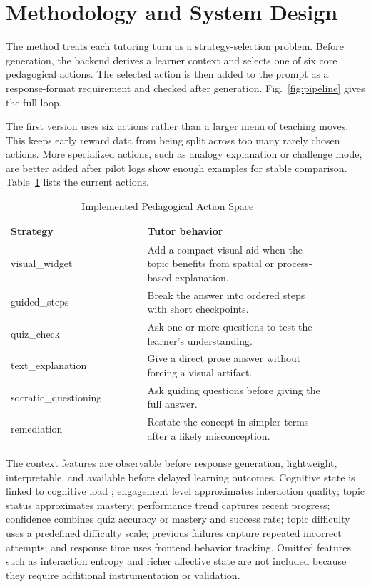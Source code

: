 \documentclass[conference]{IEEEtran}
\begin{document}
\section{Methodology and System Design}

The method treats each tutoring turn as a strategy-selection problem. Before generation, the backend derives a learner context and selects one of six core pedagogical actions. The selected action is then added to the prompt as a response-format requirement and checked after generation. Fig.~\ref{fig:pipeline} gives the full loop.

The first version uses six actions rather than a larger menu of teaching moves. This keeps early reward data from being split across too many rarely chosen actions. More specialized actions, such as analogy explanation or challenge mode, are better added after pilot logs show enough examples for stable comparison. Table~\ref{tab:actions} lists the current actions.

\begin{table}[htbp]
\caption{Implemented Pedagogical Action Space}
\label{tab:actions}
\centering
\begin{tabular}{>{\raggedright\arraybackslash}p{0.38\linewidth}>{\raggedright\arraybackslash}p{0.52\linewidth}}
\toprule
\textbf{Strategy} & \textbf{Tutor behavior} \\
\midrule
visual\_widget & Add a compact visual aid when the topic benefits from spatial or process-based explanation. \\
guided\_steps & Break the answer into ordered steps with short checkpoints. \\
quiz\_check & Ask one or more questions to test the learner's understanding. \\
text\_explanation & Give a direct prose answer without forcing a visual artifact. \\
socratic\_questioning & Ask guiding questions before giving the full answer. \\
remediation & Restate the concept in simpler terms after a likely misconception. \\
\bottomrule
\end{tabular}
\end{table}

The context features are observable before response generation, lightweight, interpretable, and available before delayed learning outcomes. Cognitive state is linked to cognitive load \cite{sweller1988}; engagement level approximates interaction quality; topic status approximates mastery; performance trend captures recent progress; confidence combines quiz accuracy or mastery and success rate; topic difficulty uses a predefined difficulty scale; previous failures capture repeated incorrect attempts; and response time uses frontend behavior tracking. Omitted features such as interaction entropy and richer affective state are not included because they require additional instrumentation or validation.
\end{document}
